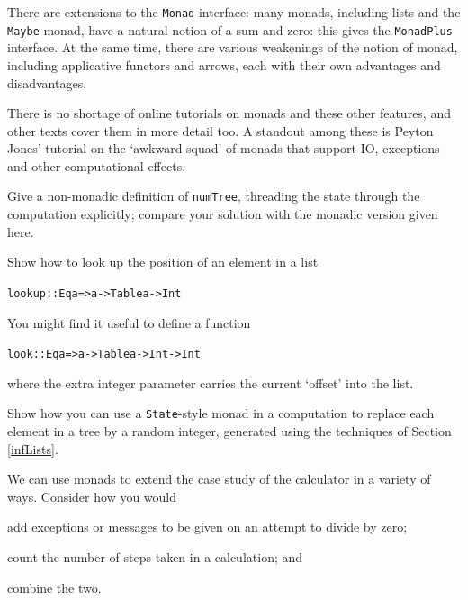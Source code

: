 There are extensions to the \texttt{Monad} interface: many monads, including lists and the \texttt{Maybe} monad, have a natural notion of a sum and zero: this gives the \texttt{MonadPlus} interface. At the same time, there are various weakenings of the notion of monad, including applicative functors and arrows, each with their own advantages and disadvantages.

There is no shortage of online tutorials on monads and these other features, and other texts cover them in more detail too. A standout among these is Peyton Jones' tutorial \cite{awkwardSquad} on the `awkward squad' of monads that support IO, exceptions and other computational effects.








\begin{exercises}

\item
Give a non-monadic definition of \texttt{numTree}, threading the state through the computation explicitly; compare your solution with the monadic version given here.

\item 
Show how to look up the position of an element in a list
\begin{alltt}
lookup :: Eq a => a -> Table a -> Int
\end{alltt}
You might find it useful to define a function
\begin{alltt}
look :: Eq a => a -> Table a -> Int -> Int
\end{alltt}
where the extra integer parameter carries the current `offset' into the list.

\item
Show how you can use a \texttt{State}-style monad in a computation to replace
each element in a tree by a random integer, generated using the techniques of
Section \ref{infLists}.

\item
We can use monads to extend the case study of the calculator in a variety of
ways. Consider how you would
\begin{titemize}
\item add exceptions or messages to be given on an attempt to divide by zero;
\item count the number of steps taken in a calculation; and
\item combine the two.
\end{titemize}

\end{exercises}



